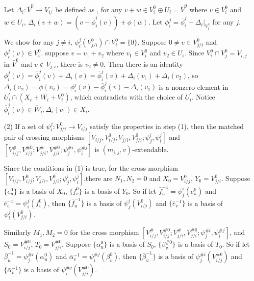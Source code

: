 \def\CTEXPreproc{Created by ctex v0.2.12, don't edit!}\documentclass[11pt]{article}
\begin{document}
\begin{pf}
Let $\Delta_i: \bar{V}^0 \rightarrow V_{i/}$ be defined as ,  for any  $v+w \in V^0 _i \oplus U_i = \bar{V}^0 $ where $v\in V^0 _i$ and $w\in U_i$, $\Delta_i (v+ w) =  ( v-\bar{\phi}^i _i (v)   )+ \phi (w) $.  Let $\phi^j _i = \bar{\phi}^j _i + \Delta_i |_{V^0 _j }$ for any
$j$.

We show for any $j\neq i$, $\phi^j _i ( V^0 _{j/i}  ) \cap V^0 _i = \{ 0 \} $. Suppose $0\neq v\in V^0 _{j/i}$ and $\phi^j _i (v)\in V^0 _i$.
suppose $v=v_1 +v_2$ where $v_1 \in V^0 _i $ and $v_2 \in U_i $. Since $V^0 _i \cap V^0 _j =V_{i,j}$ in $\bar{V}^0 $ and $v\notin V_{j,i}$, there is $v_2 \neq 0$. Then there is an identity $ \phi^j _i (v) =\bar{\phi}^j _i (v) + \Delta_i (v )=\bar{\phi}^j _i (v) + \Delta_i (v_1 )  + \Delta_i (v_2)  $, so $\Delta_i (v_2) = \phi (v_2 )= \phi^j _i (v)-\bar{\phi}^j _i (v)-\Delta_i (v_1 )  $ is a nonzero element in
$U^{'}_i \cap ( X_i + \bar{W}_i + V^0 _i )$, which contradicts with the choice of $U^{'}_i $. Notice $\bar{\phi}^j _i (v)\in \bar{W}_i ,\Delta_i (v_1 )\in X_i  $.







(2) If a set of $\psi ^j _i : V^0 _{j/i} \rightarrow V_{i/j}$ satisfy  the properties in step (1), then the matched pair of crossing morphisms $ [ V_{i/j} , V^{0}_{i/j} ; V_{j/i}, V^0 _{j/i} ; \psi^i _j , \psi^j _i     ]   $ and $[ V^{\#} _{i/j} , V^{\# 0}_{i/j} ; V^{\#} _{j/i}, V^{\# 0} _{j/i} ; \psi^{\# i} _j , \psi^{\# j} _i     ] $ is $(m_{i,j},v)$-extendable.

Since the conditions in (1) is true,  for the cross morphism
$ [ V_{i/j} , V^{0}_{i/j} ; V_{j/i}, V^0 _{j/i} ; \psi^i _j , \psi^j _i     ]   $,there are $N_1 , N_2 =0$ and $X_0 = V^{0}_{i/j}  $, $Y_0 = V^0 _{j/i}   $. Suppose $\{ e^0 _u \} $ is a basis of $X_0$, $\{ f^0 _v \}$ is a basis of $Y_0$. So if let $\bar{f}^{-1}_u = \psi^i _j ( e^0 _u )$ and $ \bar{e}^{-1}_v = \psi^j _i (f^0 _v)  $, then $\{ \bar{f}^{-1}_u \}$ is a basis of $\psi^i _j ( V^{0}_{i/j}  )$ and $\{ \bar{e}^{-1}_v \}$ is a basis of $\psi^j _i ( V^0 _{j/i}  )$.

Similarly $M_1 , M_2 =0$ for the cross morphism  $ [ V^{\#}_{i/j} , V^{\# 0}_{i/j} ; V^{\#}_{j/i}, V^{\# 0} _{j/i} ; \psi^{\# i} _j , \psi^{\# j} _i     ]   $, and $S_0 = V^{\# 0}_{i/j}  $, $T_0 = V^{\# 0} _{j/i}   $. Suppose $\{ \alpha^0 _u \} $ is a basis of $S_0 $, $\{ \beta^{\# 0} _v \}$ is a basis of $T_0$. So if let $\bar{\beta}^{-1}_u = \psi^{\# i} _j ( \alpha^0 _u )$ and $ \bar{\alpha}^{-1}_v = \psi^{\# j} _i (\beta^0 _v)  $, then $\{ \bar{\beta}^{-1}_u \}$ is a basis of $\psi^{\# i} _j ( V^{\# 0}_{i/j}  )$ and $\{ \bar{\alpha}^{-1}_v \}$ is a basis of $\psi^{\# j} _i ( V^{\# 0} _{j/i}  )$.


\end{pf}
\end{document}
